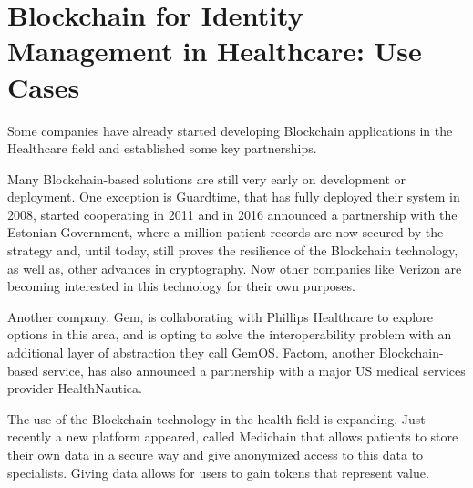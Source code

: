 \section{Blockchain for Identity Management in Healthcare: Use Cases}

Some companies have already started developing Blockchain applications in the
Healthcare field and established some key partnerships.

Many Blockchain-based solutions are still very early on development or
deployment.  One exception is Guardtime, that has fully deployed their system
in 2008, started cooperating in 2011 and in 2016 announced a partnership with
the Estonian Government, where a million patient records are now secured by the
strategy and, until today, still proves the resilience of the Blockchain
technology, as well as, other advances in cryptography.  Now other companies
like Verizon are becoming interested in this technology for their own purposes.
\cite{GuardTime2018,EstonianGovernmentGuardTime2016}

Another company, Gem, is collaborating with Phillips Healthcare to explore
options in this area, and is opting to solve the interoperability problem with
an additional layer of abstraction they call GemOS.  Factom, another
Blockchain-based service, has also announced a partnership with a major US
medical services provider
HealthNautica.\cite{BlockchainCompHealth2017,FactomPartnership2017}

The use of the Blockchain technology in the health field is expanding. Just
recently a new platform appeared, called Medichain that allows patients to
store their own data in a secure way and give anonymized access to this data to
specialists. Giving data allows for users to gain tokens that represent value.
\cite{MediChain2018}
